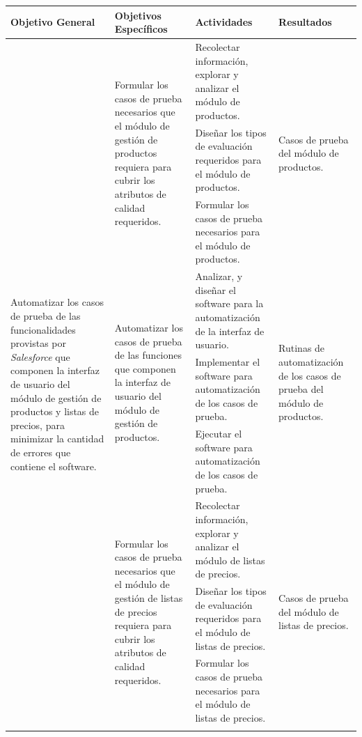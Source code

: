 \begin{table}
\centering
\small
{\def\arraystretch{1.75}
\begin{tabular}{|l|l|p{6.5cm}|l|}
\hline
Objetivo General & Objetivos Específicos & Actividades & Resultados \\
\hline
\multirow{12}{4.0cm}{Automatizar los casos de prueba de las funcionalidades
provistas por \emph{Salesforce} que componen la interfaz de usuario del módulo
de gestión de productos y listas de precios, para minimizar la cantidad de
errores que contiene el software.} &
\multirow{3}{4.0cm}{Formular los casos de prueba necesarios que el módulo de
gestión de productos requiera para cubrir los atributos de calidad requeridos.} &
Recolectar información, explorar y analizar el módulo de productos. &
\multirow{3}{4.0cm}{Casos de prueba del módulo de productos.} \\
\cline{3-3}
& & Diseñar los tipos de evaluación requeridos para el módulo de productos. & \\
\cline{3-3}
& & Formular los casos de prueba necesarios para el módulo de productos. & \\
\cline{2-4}

& \multirow{3}{4.0cm}{Automatizar los casos de prueba de las funciones que
componen la interfaz de usuario del módulo de gestión de productos.} &
Analizar, y diseñar el software para la automatización de la interfaz de
usuario. &
\multirow{3}{4.0cm}{Rutinas de automatización de los casos de prueba del módulo
de productos.} \\
\cline{3-3}
& & Implementar el software para automatización de los casos de prueba. & \\
\cline{3-3}
& & Ejecutar el software para automatización de los casos de prueba. & \\
\cline{2-4}

& \multirow{3}{4.0cm}{Formular los casos de prueba necesarios que el módulo de
gestión de listas de precios requiera para cubrir los atributos de calidad
requeridos.} &
Recolectar información, explorar y analizar el módulo de listas de precios. &
\multirow{3}{4.0cm}{Casos de prueba del módulo de listas de precios.} \\
\cline{3-3}
& & Diseñar los tipos de evaluación requeridos para el módulo de listas de
precios. & \\
\cline{3-3}
& & Formular los casos de prueba necesarios para el módulo de listas de
precios. & \\
\cline{2-4}


\end{tabular}}
\end{table}
